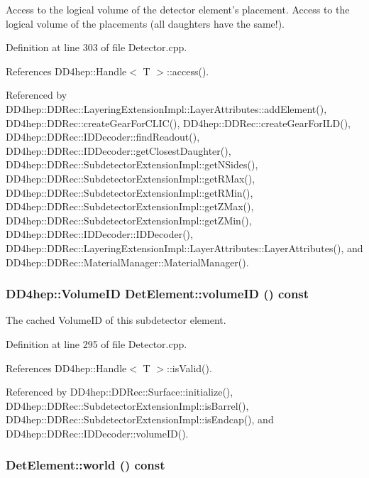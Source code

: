 Access to the logical volume of the detector element's placement. Access to the logical volume of the placements (all daughters have the same!). 

Definition at line 303 of file Detector.cpp.

References DD4hep::Handle$<$ T $>$::access().

Referenced by DD4hep::DDRec::LayeringExtensionImpl::LayerAttributes::addElement(), DD4hep::DDRec::createGearForCLIC(), DD4hep::DDRec::createGearForILD(), DD4hep::DDRec::IDDecoder::findReadout(), DD4hep::DDRec::IDDecoder::getClosestDaughter(), DD4hep::DDRec::SubdetectorExtensionImpl::getNSides(), DD4hep::DDRec::SubdetectorExtensionImpl::getRMax(), DD4hep::DDRec::SubdetectorExtensionImpl::getRMin(), DD4hep::DDRec::SubdetectorExtensionImpl::getZMax(), DD4hep::DDRec::SubdetectorExtensionImpl::getZMin(), DD4hep::DDRec::IDDecoder::IDDecoder(), DD4hep::DDRec::LayeringExtensionImpl::LayerAttributes::LayerAttributes(), and DD4hep::DDRec::MaterialManager::MaterialManager().\hypertarget{class_d_d4hep_1_1_geometry_1_1_det_element_a003e38a1be1b10caa917dd457637d104}{
\subsubsection[{volumeID}]{\setlength{\rightskip}{0pt plus 5cm}DD4hep::VolumeID DetElement::volumeID () const}}
\label{class_d_d4hep_1_1_geometry_1_1_det_element_a003e38a1be1b10caa917dd457637d104}


The cached VolumeID of this subdetector element. 

Definition at line 295 of file Detector.cpp.

References DD4hep::Handle$<$ T $>$::isValid().

Referenced by DD4hep::DDRec::Surface::initialize(), DD4hep::DDRec::SubdetectorExtensionImpl::isBarrel(), DD4hep::DDRec::SubdetectorExtensionImpl::isEndcap(), and DD4hep::DDRec::IDDecoder::volumeID().\hypertarget{class_d_d4hep_1_1_geometry_1_1_det_element_a6ffabad2792a7190089d4a042d5440b8}{
\subsubsection[{world}]{ DetElement::world () const}}
\label{class_d_d4hep_1_1_geometry_1_1_det_element_a6ffabad2792a7190089d4a042d5440b8}


